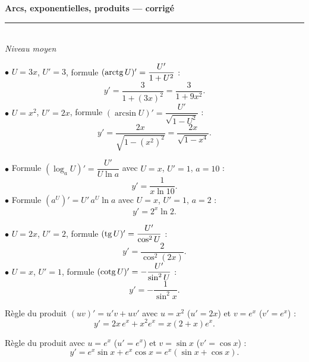 \pagestyle{fancy}\fancyhf{}
\fancyfoot[C]{\small\thepage}
\renewcommand{\headrulewidth}{0.8pt}



\begin{center}
{\LARGE\bfseries\color{primarydark} Arcs, exponentielles, produits — corrigé}\\[2pt]
{\color{primary}\rule{0.5\textwidth}{1.2pt}}\\[4pt]
{\small\itshape Niveau moyen}
\end{center}
\vspace{2mm}

\begin{corr}[1 --- $y=\arctg(3x)$ puis $y=\arcsin(x^2)$]
$\bullet$ $U=3x$, $U'=3$, formule $(\operatorname{arctg} U)'=\dfrac{U'}{1+U^2}$ :
\[
y'=\frac{3}{1+(3x)^2}=\frac{3}{1+9x^2}.
\]
$\bullet$ $U=x^2$, $U'=2x$, formule $(\arcsin U)'=\dfrac{U'}{\sqrt{1-U^2}}$ :
\[
y'=\frac{2x}{\sqrt{1-(x^2)^2}}=\frac{2x}{\sqrt{1-x^4}}.
\]
\end{corr}

\begin{corr}[2 --- $y=\log_{10}(x)$ puis $y=2^{x}$]
$\bullet$ Formule $(\log_a U)'=\dfrac{U'}{U\ln a}$ avec $U=x$, $U'=1$, $a=10$ :
\[
y'=\frac{1}{x\ln 10}.
\]
$\bullet$ Formule $(a^U)'=U'\,a^U\ln a$ avec $U=x$, $U'=1$, $a=2$ :
\[
y'=2^{x}\ln 2.
\]
\end{corr}

\begin{corr}[3 --- $y=\tg(2x)$ puis $y=\cotg(x)$]
$\bullet$ $U=2x$, $U'=2$, formule $(\operatorname{tg} U)'=\dfrac{U'}{\cos^2 U}$ :
\[
y'=\frac{2}{\cos^2(2x)}.
\]
$\bullet$ $U=x$, $U'=1$, formule $(\operatorname{cotg} U)'=-\dfrac{U'}{\sin^2 U}$ :
\[
y'=-\frac{1}{\sin^2 x}.
\]
\end{corr}

\begin{corr}[4 --- $y=x^2 e^{x}$]
Règle du produit $(uv)'=u'v+uv'$ avec $u=x^2$ ($u'=2x$) et $v=e^x$ ($v'=e^x$) :
\[
y'=2x\,e^x+x^2 e^x = x(2+x)e^x.
\]
\end{corr}

\begin{corr}[5 --- $y=e^{x}\sin(x)$]
Règle du produit avec $u=e^x$ ($u'=e^x$) et $v=\sin x$ ($v'=\cos x$) :
\[
y'=e^x\sin x + e^x\cos x = e^x(\sin x+\cos x).
\]
\end{corr}


